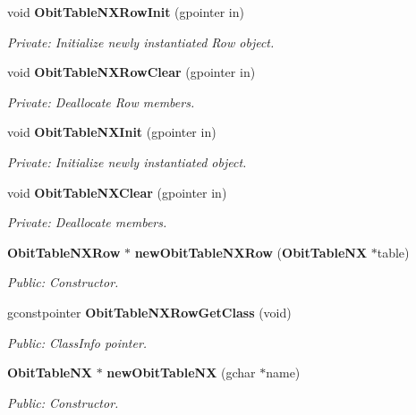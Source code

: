 \begin{CompactItemize}
\item 
void {\bf Obit\-Table\-NXRow\-Init} (gpointer in)
\begin{CompactList}\small\item\em Private: Initialize newly instantiated Row object. \item\end{CompactList}\item 
void {\bf Obit\-Table\-NXRow\-Clear} (gpointer in)
\begin{CompactList}\small\item\em Private: Deallocate Row members. \item\end{CompactList}\item 
void {\bf Obit\-Table\-NXInit} (gpointer in)
\begin{CompactList}\small\item\em Private: Initialize newly instantiated object. \item\end{CompactList}\item 
void {\bf Obit\-Table\-NXClear} (gpointer in)
\begin{CompactList}\small\item\em Private: Deallocate members. \item\end{CompactList}\item 
{\bf Obit\-Table\-NXRow} $\ast$ {\bf new\-Obit\-Table\-NXRow} ({\bf Obit\-Table\-NX} $\ast$table)
\begin{CompactList}\small\item\em Public: Constructor. \item\end{CompactList}\item 
gconstpointer {\bf Obit\-Table\-NXRow\-Get\-Class} (void)
\begin{CompactList}\small\item\em Public: Class\-Info pointer. \item\end{CompactList}\item 
{\bf Obit\-Table\-NX} $\ast$ {\bf new\-Obit\-Table\-NX} (gchar $\ast$name)
\begin{CompactList}\small\item\em Public: Constructor. \item\end{CompactList}\item 

\end{CompactItemize}
